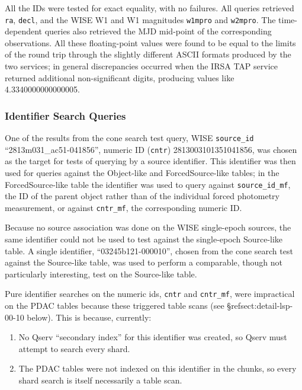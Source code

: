 \documentclass[DM,lsstdraft,STR,toc]{lsstdoc}
\begin{document}
All the IDs were tested for exact equality, with no failures.
All queries retrieved \verb|ra|, \verb|decl|, and the WISE W1 and W1 magnitudes \verb|w1mpro| and \verb|w2mpro|.
The time-dependent queries also retrieved the MJD mid-point of the corresponding observations.
All these floating-point values were found to be equal to the limits of the round trip through the slightly different ASCII formats produced by the two services;
in general discrepancies occurred when the IRSA TAP service returned additional non-significant digits,
producing values like 4.3340000000000005.

\subsubsection{Identifier Search Queries}

One of the results from the cone search test query, WISE \verb|source_id| ``2813m031\_ac51-041856'',
numeric ID (\verb|cntr|) 2813003101351041856,
was chosen as the target for tests of querying by a source identifier.
This identifier was then used for queries against the Object-like and ForcedSource-like tables;
in the ForcedSource-like table the identifier was used to query against \verb|source_id_mf|,
the ID of the parent object rather than of the individual forced photometry measurement,
or against \verb|cntr_mf|, the corresponding numeric ID.

Because no source association was done on the WISE single-epoch sources,
the same identifier could not be used to test against the single-epoch Source-like table.
A single identifier, ``03245b121-000010'', chosen from the cone search test against the Source-like table,
was used to perform a comparable, though not particularly interesting, test on the Source-like table.

Pure identifier searches on the numeric ids, \verb|cntr| and \verb|cntr_mf|,
were impractical on the PDAC tables because these triggered table scans (see \S ref{sect:detail-lsp-00-10} below).
This is because, currently:

\begin{enumerate}
\item{No Qserv ``secondary index'' for this identifier was created, so Qserv must attempt to search every shard.}
\item{The PDAC tables were not indexed on this identifier in the chunks, so every shard search is itself necessarily a table scan.}
\end{enumerate}
\end{document}

